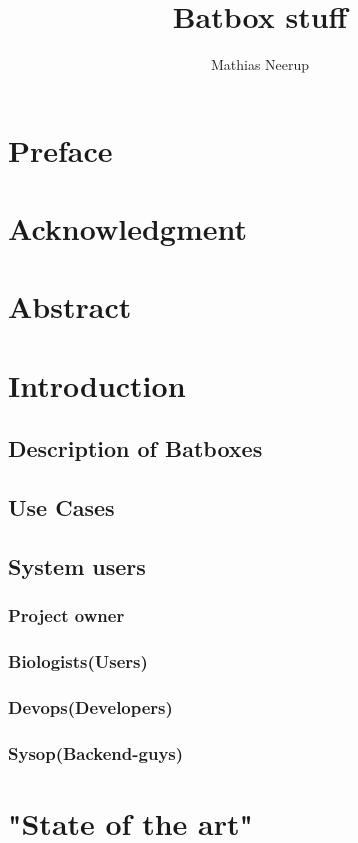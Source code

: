 \documentclass[10pt,a4paper]{memoir}
\author{Mathias Neerup}
\title{Batbox stuff}
\begin{document}
\maketitle
\tableofcontents


\section{Preface}
\section{Acknowledgment}
\section{Abstract}

\section{Introduction}
\subsection{Description of Batboxes}
\subsection{Use Cases}
\subsection{System users}
\subsubsection*{Project owner}
\subsubsection*{Biologists(Users)}
\subsubsection*{Devops(Developers)}
\subsubsection*{Sysop(Backend-guys)}

\section{"State of the art"}
\end{document}
